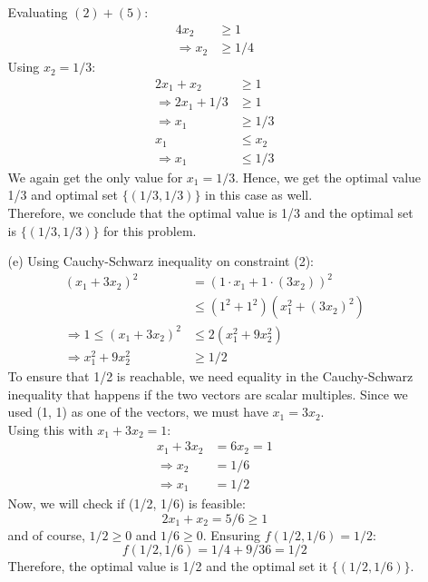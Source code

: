 \documentclass{article}
\begin{document}
\begin{itemize}
\begin{itemize}
    Evaluating $(2) + (5)$:
    \begin{align*}
      4 x_2 &\ge 1 \\
      \Rightarrow x_2 &\ge 1/4
    \end{align*}
    Using $x_2 = 1/3$:
    \begin{align*}
      2 x_1 + x_2 &\ge 1 \\
      \Rightarrow 2 x_1 + 1/3 &\ge 1 \\
      \Rightarrow x_1 &\ge 1/3 \\
      x_1 &\le x_2 \\
      \Rightarrow x_1 &\le 1/3
    \end{align*}
    We again get the only value for $x_1 = 1/3$. Hence, we get the optimal value 1/3 and optimal set $\{(1/3, 1/3)\}$ in this case as well. \\
    Therefore, we conclude that the optimal value is 1/3 and the optimal set is $\{(1/3, 1/3)\}$ for this problem.
    \item[(e)] Using Cauchy-Schwarz inequality on constraint (2):
    \begin{align*}
      (x_1 + 3 x_2)^2 &= (1 \cdot x_1 + 1 \cdot (3 x_2))^2\\
      &\le (1^2 + 1^2)(x_1^2 + (3 x_2)^2) \\
      \Rightarrow 1 \le (x_1 + 3 x_2)^2 &\le 2(x_1^2 + 9 x_2^2) \\
      \Rightarrow x_1^2 + 9 x_2^2 &\ge 1/2
    \end{align*}
    To ensure that 1/2 is reachable, we need equality in the Cauchy-Schwarz inequality that happens if the two vectors are scalar multiples. Since we used (1, 1) as one of the vectors, we must have $x_1 = 3 x_2$. \\
    Using this with $x_1 + 3 x_2 = 1$:
    \begin{align*}
      x_1 + 3 x_2 &= 6 x_2 = 1 \\
      \Rightarrow x_2 &= 1/6 \\
      \Rightarrow x_1 &= 1/2
    \end{align*}
    Now, we will check if (1/2, 1/6) is feasible:
    \[ 2 x_1 + x_2 = 5/6 \ge 1 \]
    and of course, $1/2 \ge 0$ and $1/6 \ge 0$. Ensuring $f(1/2, 1/6) = 1/2$:
    \[ f(1/2, 1/6) = 1/4 + 9/36 = 1/2 \]
    Therefore, the optimal value is 1/2 and the optimal set it $\{(1/2, 1/6)\}$.
  \end{itemize}


\end{itemize}
\end{document}
